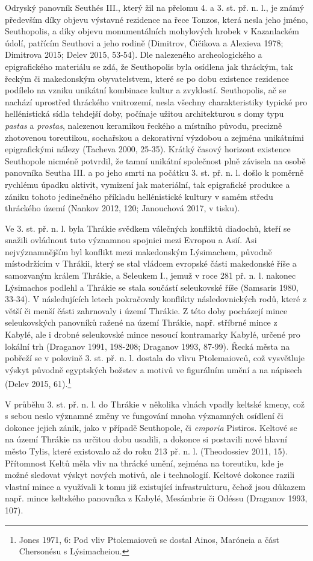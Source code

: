 Odryský panovník Seuthés III., který žil na přelomu 4. a 3. st. př. n. l., je známý především díky objevu výstavné rezidence na řece Tonzos, která nesla jeho jméno, Seuthopolis, a díky objevu monumentálních mohylových hrobek v Kazanlackém údolí, patřícím Seuthovi a jeho rodině (Dimitrov, Čičikova a Alexieva 1978; Dimitrova 2015; Delev 2015, 53-54). Dle nalezeného archeologického a epigrafického materiálu se zdá, že Seuthopolis byla osídlena jak thráckým, tak řeckým či makedonským obyvatelstvem, které se po dobu existence rezidence podílelo na vzniku unikátní kombinace kultur a zvyklostí. Seuthopolis, ač se nachází uprostřed thráckého vnitrozemí, nesla všechny charakteristiky typické pro hellénistická sídla tehdejší doby, počínaje užitou architekturou s domy typu {\em pastas} a {\em prostas}, nalezenou keramikou řeckého a místního původu, precizně zhotovenou toreutikou, sochařskou a dekorativní výzdobou a zejména unikátními epigrafickými nálezy (Tacheva 2000, 25-35). Krátký časový horizont existence Seuthopole nicméně potvrdil, že tamní unikátní společnost plně závisela na osobě panovníka Seutha III. a po jeho smrti na počátku 3. st. př. n. l. došlo k poměrně rychlému úpadku aktivit, vymizení jak materiální, tak epigrafické produkce a zániku tohoto jedinečného příkladu hellénistické kultury v samém středu thráckého území (Nankov 2012, 120; Janouchová 2017, v tisku).

Ve 3. st. př. n. l. byla Thrákie svědkem válečných konfliktů diadochů, kteří se snažili ovládnout tuto významnou spojnici mezi Evropou a Asií. Asi nejvýznamnějším byl konflikt mezi makedonským Lýsimachem, původně místodržícím v Thrákii, který se stal vládcem evropské části makedonské říše a samozvaným králem Thrákie, a Seleukem I., jemuž v roce 281 př. n. l. nakonec Lýsimachos podlehl a Thrákie se stala součástí seleukovské říše (Samsaris 1980, 33-34). V následujících letech pokračovaly konflikty následovnických rodů, které z větší či menší části zahrnovaly i území Thrákie. Z této doby pocházejí mince seleukovských panovníků ražené na území Thrákie, např. stříbrné mince z Kabylé, ale i drobné seleukovské mince nesoucí kontramarky Kabylé, určené pro lokální trh (Draganov 1991, 198-208; Draganov 1993, 87-99). Řecká města na pobřeží se v polovině 3. st. př. n. l. dostala do vlivu Ptolemaiovců, což vysvětluje výskyt původně egyptských božstev a motivů ve figurálním umění a na nápisech (Delev 2015, 61).\footnote{Jones 1971, 6: Pod vliv Ptolemaiovců se dostal Ainos, Maróneia a část Chersonésu s Lýsimacheiou.}

V průběhu 3. st. př. n. l. do Thrákie v několika vlnách vpadly keltské kmeny, což s sebou neslo významné změny ve fungování mnoha významných osídlení či dokonce jejich zánik, jako v případě Seuthopole, či {\em emporia} Pistiros. Keltové se na území Thrákie na určitou dobu usadili, a dokonce si postavili nové hlavní město Tylis, které existovalo až do roku 213 př. n. l. (Theodossiev 2011, 15). Přítomnost Keltů měla vliv na thrácké umění, zejména na toreutiku, kde je možné sledovat výskyt nových motivů, ale i technologií. Keltové dokonce razili vlastní mince a využívali k tomu již existující infrastrukturu, čehož jsou důkazem např. mince keltského panovníka z Kabylé, Mesámbrie či Odéssu (Draganov 1993, 107).

